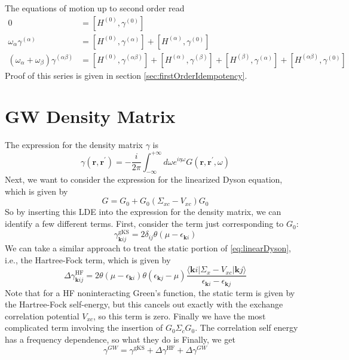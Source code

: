 The equations of motion up to second order read
\begin{align}
0 &=\left[H^{(0)}, \gamma^{(0)}\right] \\
\omega_{\alpha} \gamma^{(\alpha)}& =\left[H^{(0)}, \gamma^{(\alpha)}\right]+\left[H^{(\alpha)}, \gamma^{(0)}\right]\\
\left(\omega_{\alpha}+\omega_{\beta}\right) \gamma^{(\alpha \beta)}& = {\left[H^{(0)}, \gamma^{(\alpha \beta)}\right]+\left[H^{(\alpha)}, \gamma^{(\beta)}\right] } +\left[H^{(\beta)}, \gamma^{(\alpha)}\right]+\left[H^{(\alpha \beta)}, \gamma^{(0)}\right]
\end{align}
Proof of this series is given in section \ref{sec:firstOrderIdempotency}. 
\section{GW Density Matrix}
The expression for the density matrix $\gamma $ is
\begin{equation}
\gamma\left(\mathbf{r}, \mathbf{r}^{\prime}\right)=-\frac{i}{2 \pi} \int_{-\infty}^{+\infty} d \omega e^{i \eta \omega} G\left(\mathbf{r}, \mathbf{r}^{\prime}, \omega\right)
\end{equation}
Next, we want to consider the expression for the linearized Dyson equation, which is given by
\begin{equation}
G=G_0+G_0\left(\Sigma_{x c}-V_{x c}\right) G_0
\label{eq:linearDyson}
\end{equation}
So by inserting this LDE into the expression for the density matrix, we can identify a few different terms. First, consider the term just corresponding to $G_0$:
\begin{equation}
\gamma_{\mathbf{k} i j}^{\mathrm{gKS}}=2 \delta_{i j} \theta\left(\mu-\epsilon_{\mathbf{k} i}\right)
\end{equation}
We can take a similar approach to treat the static portion of \ref{eq:linearDyson}, i.e., the Hartree-Fock term, which is given by
\begin{equation}
\Delta \gamma_{\mathbf{k} i j}^{\mathrm{HF}}=2 \theta\left(\mu-\epsilon_{\mathbf{k} i}\right) \theta\left(\epsilon_{\mathbf{k} j}-\mu\right) \frac{\langle\mathbf{k} i| \Sigma_x-V_{xc}|\mathbf{k} j\rangle}{\epsilon_{\mathbf{k} i}-\epsilon_{\mathbf{k} j}}
\end{equation}
Note that for a HF noninteracting Green's function, the static term is given by the Hartree-Fock self-energy, but this cancels out exactly with the exchange correlation potential $V_{xc}$, so this term is zero. Finally we have the most complicated term involving the insertion of $G_0\Sigma _c G_0$. The correlation self energy has a frequency dependence, so what they do is
Finally, we get
\begin{equation}
\gamma^{G W}=\gamma^{\mathrm{gKS}}+\Delta \gamma^{\mathrm{HF}}+\Delta \gamma^{G W}
\end{equation}
